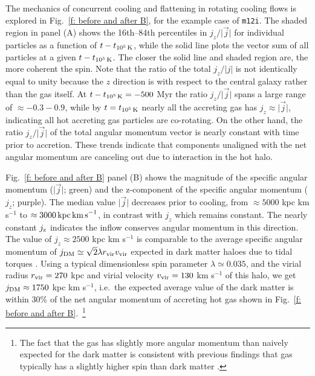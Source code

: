 \documentclass[fleqn,usenatbib]{mnras}
\newcommand{\tcools}{t_{10^5\,{\rm K}}}
\newcommand{\Rvir}{r_{\rm vir}}
\newcommand{\vvir}{v_{\rm vir}}
\begin{document}
The mechanics of concurrent cooling and flattening in rotating cooling flows is explored in Fig.~\ref{f: before and after B}, for the example case of \texttt{m12i}.
The shaded region in panel (A) shows the 16th--84th percentiles in $j_z/\vert\vec j\vert$ for individual particles as a function of $t-\tcools$, while the solid line plots the vector sum of all particles at a given $t-\tcools$.
The closer the solid line and shaded region are, the more coherent the spin.
Note that the ratio of the total $j_z/\vert j \vert$ is not identically equal to unity because the $z$ direction is with respect to the central galaxy rather than the gas itself.
At $t-\tcools=-500$ Myr the ratio $j_z/\vert\vec j\vert$ spans a large range of $\approx -0.3 - 0.9$, while by $t=\tcools$ nearly all the accreting gas has $j_z\approx\vert\vec j\vert$, indicating all hot accreting gas particles are co-rotating.
On the other hand, the ratio $j_z/\vert\vec j\vert$ of the total angular momentum vector is nearly constant with time prior to accretion. 
These trends indicate that components unaligned with the net angular momentum are canceling out due to interaction in the hot halo.

Fig.~\ref{f: before and after B} panel (B) shows the magnitude of the specific angular momentum ($\vert \vec j \vert$; green) and the z-component of the specific angular momentum ($j_z$; purple).
The median value $\vert \vec j \vert$ decreases prior to cooling, from $\approx 5000$ kpc km s$^{-1}$ to $\approx 3000\,{\rm kpc\,km\,s}^{-1}$, in contrast with  $j_z$ which remains constant.
The nearly constant $j_{\rm z}$ indicates the inflow conserves angular momentum in this direction. 
The value of $j_z\approx 2500$ kpc km s$^{-1}$ is comparable to the average specific angular momentum of $j_{\rm DM} \simeq \sqrt{2}\lambda \Rvir \vvir$ expected in dark matter haloes due to tidal torques \citep[e.g.][]{Bullock2001}.
Using a typical dimensionless spin parameter $\lambda \simeq 0.035$, and the virial radius $\Rvir=270$ kpc and virial velocity $\vvir=130$ km s$^{-1}$ of this halo, we get $j_{\rm DM}\approx1750$ kpc km s$^{-1}$, i.e.~the expected average value of the dark matter is within $30\%$ of the net angular momentum of accreting hot gas shown in Fig.~\ref{f: before and after B}.~\footnote{The fact that the gas has slightly more angular momentum than naively expected for the dark matter is consistent with previous findings that gas typically has a slightly higher spin than dark matter \citep[e.g.][]{Stewart2017}.}
\end{document}

